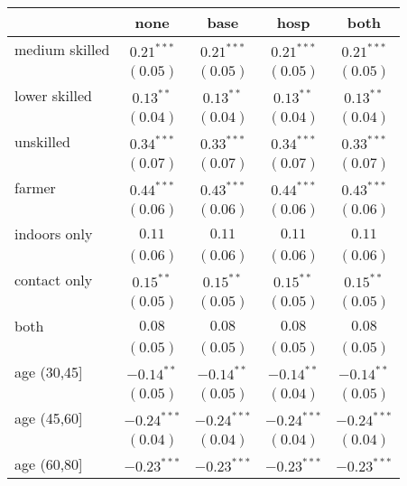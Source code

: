 
\begin{table}[h!]
\begin{center}
\begin{small}
\begin{tabular}{l c c c c}
\hline
 & none & base & hosp & both \\
\hline
medium skilled     & $0.21^{***}$  & $0.21^{***}$  & $0.21^{***}$  & $0.21^{***}$  \\
                   & $(0.05)$      & $(0.05)$      & $(0.05)$      & $(0.05)$      \\
lower skilled      & $0.13^{**}$   & $0.13^{**}$   & $0.13^{**}$   & $0.13^{**}$   \\
                   & $(0.04)$      & $(0.04)$      & $(0.04)$      & $(0.04)$      \\
unskilled          & $0.34^{***}$  & $0.33^{***}$  & $0.34^{***}$  & $0.33^{***}$  \\
                   & $(0.07)$      & $(0.07)$      & $(0.07)$      & $(0.07)$      \\
farmer             & $0.44^{***}$  & $0.43^{***}$  & $0.44^{***}$  & $0.43^{***}$  \\
                   & $(0.06)$      & $(0.06)$      & $(0.06)$      & $(0.06)$      \\
indoors only       & $0.11$        & $0.11$        & $0.11$        & $0.11$        \\
                   & $(0.06)$      & $(0.06)$      & $(0.06)$      & $(0.06)$      \\
contact only       & $0.15^{**}$   & $0.15^{**}$   & $0.15^{**}$   & $0.15^{**}$   \\
                   & $(0.05)$      & $(0.05)$      & $(0.05)$      & $(0.05)$      \\
both               & $0.08$        & $0.08$        & $0.08$        & $0.08$        \\
                   & $(0.05)$      & $(0.05)$      & $(0.05)$      & $(0.05)$      \\
age (30,45]        & $-0.14^{**}$  & $-0.14^{**}$  & $-0.14^{**}$  & $-0.14^{**}$  \\
                   & $(0.05)$      & $(0.05)$      & $(0.04)$      & $(0.05)$      \\
age (45,60]        & $-0.24^{***}$ & $-0.24^{***}$ & $-0.24^{***}$ & $-0.24^{***}$ \\
                   & $(0.04)$      & $(0.04)$      & $(0.04)$      & $(0.04)$      \\
age (60,80]        & $-0.23^{***}$ & $-0.23^{***}$ & $-0.23^{***}$ & $-0.23^{***}$ \\

\end{tabular}
\end{small}
\end{center}
\end{table}

